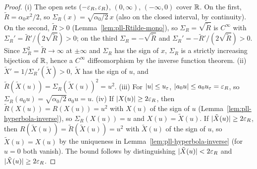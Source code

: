 \begin{proof}
(i) The open sets $(-\varepsilon_R,\varepsilon_R)$, $(0,\infty)$, $(-\infty,0)$ cover $\mathbb{R}$. On the first,
$\tilde R=\alpha_0x^2/2$, so $\Sigma_R(x)=\sqrt{\alpha_0/2}\,x$ (also on the closed interval, by continuity). On the
second, $\tilde R>0$ (Lemma~\ref{lem:pll-Rtilde-mono}), so $\Sigma_R=\sqrt{\tilde R}$ is $C^\infty$ with
$\Sigma_R'=\tilde R'/(2\sqrt{\tilde R})>0$; on the third $\Sigma_R=-\sqrt{\tilde R}$ and
$\Sigma_R'=-\tilde R'/(2\sqrt{\tilde R})>0$. Since $\Sigma_R^2=\tilde R\to\infty$ at $\pm\infty$ and $\Sigma_R$ has
the sign of $x$, $\Sigma_R$ is a strictly increasing bijection of $\mathbb{R}$, hence a $C^\infty$ diffeomorphism by the
inverse function theorem. (ii) $\tilde X'=1/\Sigma_R'(\tilde X)>0$, $\tilde X$ has the sign of $u$, and
$\tilde R(\tilde X(u))=\Sigma_R(\tilde X(u))^2=u^2$. (iii) For $|u|\le u_\varepsilon$, $|a_0u|\le a_0u_\varepsilon=\varepsilon_R$, so
$\Sigma_R(a_0u)=\sqrt{\alpha_0/2}\,a_0u=u$. (iv) If $|X(u)|\ge2\varepsilon_R$, then $\tilde R(X(u))=R(X(u))=u^2$ with $X(u)$
of the sign of $u$ (Lemma~\ref{lem:pll-hyperbola-inverse}), so $\Sigma_R(X(u))=u$ and $X(u)=\tilde X(u)$. If
$|\tilde X(u)|\ge2\varepsilon_R$, then $R(\tilde X(u))=\tilde R(\tilde X(u))=u^2$ with $\tilde X(u)$ of the sign of $u$,
so $\tilde X(u)=X(u)$ by the uniqueness in Lemma~\ref{lem:pll-hyperbola-inverse} (for $u=0$ both vanish). The bound
follows by distinguishing $|\tilde X(u)|<2\varepsilon_R$ and $|\tilde X(u)|\ge2\varepsilon_R$.
\end{proof}


